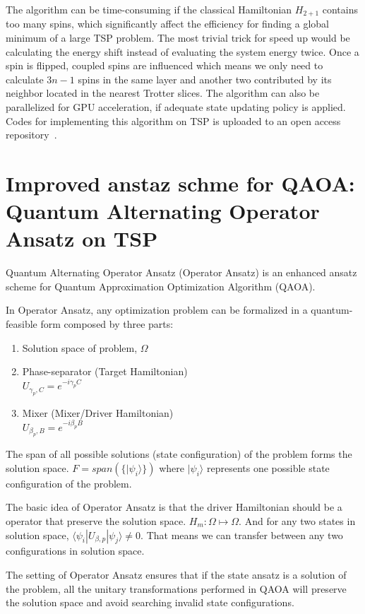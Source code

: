 \documentclass[aps,pra,twocolumn,superscriptaddress]{revtex4-2}
\begin{document}
The algorithm can be time-consuming if the classical Hamiltonian $H_{2+1}$ contains too many spins, which significantly affect the efficiency for finding a global minimum of a large TSP problem. The most trivial trick for speed up would be calculating the energy shift instead of evaluating the system energy twice. Once a spin is flipped, coupled spins are influenced which means we only need to calculate $3n-1$ spins in the same layer and another two contributed by its neighbor located in the nearest Trotter slices. The algorithm can also be parallelized for GPU acceleration, if adequate state updating policy is applied. Codes for implementing this algorithm on TSP is uploaded to an open access repository~\cite{codes}.

\section{Improved anstaz schme for QAOA: Quantum Alternating Operator Ansatz on TSP\label{app:QMC}}
Quantum Alternating Operator Ansatz\cite{} (Operator Ansatz) is an enhanced ansatz scheme for Quantum Approximation Optimization Algorithm (QAOA).

In Operator Ansatz, any optimization problem can be formalized in a quantum-feasible form composed by three parts:

\begin{enumerate}
    \item Solution space of problem, $\Omega$
    \item Phase-separator (Target Hamiltonian)\\
    $U_{\gamma_p,C}=e^{-i\gamma_p C}$
    \item Mixer (Mixer/Driver Hamiltonian)\\
    $U_{\beta_p,B}=e^{-i\beta_p B}$
\end{enumerate}

The span of all possible solutions (state configuration) of the problem forms the solution space. $F=span(\{|\psi_i\rangle\})$ where $|\psi_i\rangle$ represents one possible state configuration of the problem. 

The basic idea of Operator Ansatz is that the driver Hamiltonian should be a operator that preserve the solution space. $H_{m}: \Omega \mapsto \Omega $. And for any two 
states in solution space, $\langle \psi_i|U_{\beta,p}|\psi_j\rangle \neq 0$. That means we can transfer between any two configurations in solution space.

The setting of Operator Ansatz ensures that if the state ansatz is a solution of the problem, all the unitary transformations performed in QAOA will preserve the solution space and avoid searching invalid state configurations.
\end{document}
